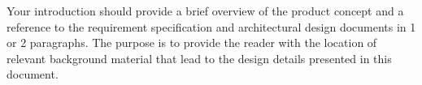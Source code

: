 Your introduction should provide a brief overview of the product concept and a reference to the requirement specification and architectural design documents in 1 or 2 paragraphs. The purpose is to provide the reader with the location of relevant background material that lead to the design details presented in this document.
